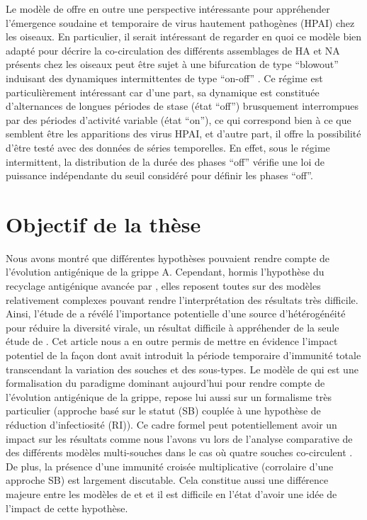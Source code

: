 Le modèle de \citet{Recker2007} offre en outre une perspective
intéressante pour appréhender l'émergence soudaine et temporaire de
virus hautement pathogènes (HPAI) chez les oiseaux.  En particulier, il
serait intéressant de regarder en quoi ce modèle bien adapté pour
décrire la co-circulation des différents assemblages de HA et NA
présents chez les oiseaux peut être sujet à une bifurcation de type
``blowout'' induisant des dynamiques intermittentes de type ``on-off''
\citep{Ott1994}. Ce régime est particulièrement intéressant car d'une
part, sa dynamique est constituée d'alternances de longues périodes de
stase (état ``off'') brusquement interrompues par des périodes
d'activité variable (état ``on''), ce qui correspond bien à ce que
semblent être les apparitions des virus HPAI, et d'autre part, il
offre la possibilité d'être testé avec des données de séries
temporelles.  En effet, sous le régime intermittent, la distribution
de la durée des phases ``off'' vérifie une loi de puissance
indépendante du seuil considéré pour définir les phases ``off''.


\section{Objectif de la thèse}

Nous avons montré que différentes hypothèses pouvaient rendre compte
de l'évolution antigénique de la grippe A. Cependant, hormis
l'hypothèse du recyclage antigénique avancée par \citet{Recker2007},
elles reposent toutes sur des modèles relativement complexes pouvant
rendre l'interprétation des résultats très difficile. Ainsi, l'étude
de \citet{Tria2005} a révélé l'importance potentielle d'une source
d'hétérogénéité pour réduire la diversité virale, un résultat
difficile à appréhender de la seule étude de \citet{Ferguson2003}.
Cet article nous a en outre permis de mettre en évidence l'impact
potentiel de la façon dont \citet{Ferguson2003} avait introduit la
période temporaire d'immunité totale transcendant la variation des
souches et des sous-types.  Le modèle de \citet{Koelle2006} qui est
une formalisation du paradigme dominant aujourd'hui pour rendre compte
de l'évolution antigénique de la grippe, repose lui aussi sur un
formalisme très particulier (approche basé sur le statut (SB) couplée
à une hypothèse de réduction d'infectiosité (RI)). Ce cadre formel
peut potentiellement avoir un impact sur les résultats comme nous
l'avons vu lors de l'analyse comparative de des différents modèles
multi-souches dans le cas où quatre souches co-circulent
\citep{Dawes2002}. De plus, la présence d'une immunité croisée
multiplicative (corrolaire d'une approche SB) est largement
discutable. Cela constitue aussi une différence majeure entre les
modèles de \citet{Koelle2006} et \citet{Ferguson2003} et il est
difficile en l'état d'avoir une idée de l'impact de cette hypothèse.

